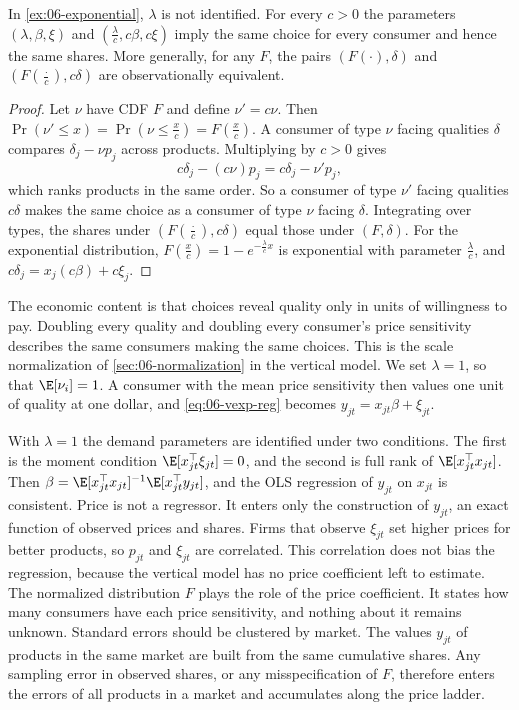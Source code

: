 \begin{proposition}\label{prop:06-vscale}
In \cref{ex:06-exponential}, $\lambda$ is not identified. For every $c > 0$ the parameters
$(\lambda, \beta, \xi)$ and $(\frac{\lambda}{c}, c\beta, c\xi)$ imply the same choice for every consumer and
hence the same shares. More generally, for any $F$, the pairs $(F(\cdot), \delta)$ and
$(F(\frac{\cdot}{c}), c\delta)$ are observationally equivalent.
\end{proposition}

\begin{proof}
Let $\nu$ have CDF $F$ and define $\nu' = c\nu$. Then $\Pr(\nu' \le x) = \Pr(\nu \le \frac{x}{c}) = F(\frac{x}{c})$.
A consumer of type $\nu$ facing qualities $\delta$ compares $\delta_j - \nu p_j$ across products. Multiplying
by $c > 0$ gives
\begin{equation*}
  c\delta_j - (c\nu)p_j = c\delta_j - \nu' p_j ,
\end{equation*}
which ranks products in the same order. So a consumer of type $\nu'$ facing qualities $c\delta$ makes the
same choice as a consumer of type $\nu$ facing $\delta$. Integrating over types, the shares under
$(F(\frac{\cdot}{c}), c\delta)$ equal those under $(F, \delta)$. For the exponential distribution,
$F(\frac{x}{c}) = 1 - e^{-\frac{\lambda}{c}x}$ is exponential with parameter $\frac{\lambda}{c}$, and
$c\delta_j = x_j(c\beta) + c\xi_j$.
\end{proof}

The economic content is that choices reveal quality only in units of willingness to pay. Doubling every
quality and doubling every consumer's price sensitivity describes the same consumers making the same
choices. This is the scale normalization of \cref{sec:06-normalization} in the vertical model. We set
$\lambda = 1$, so that $\E[\nu_i] = 1$. A consumer with the mean price sensitivity then values one unit of
quality at one dollar, and \eqref{eq:06-vexp-reg} becomes $y_{jt} = x_{jt}\beta + \xi_{jt}$.

With $\lambda = 1$ the demand parameters are identified under two conditions. The first is the moment
condition $\E[x_{jt}^\top\xi_{jt}] = 0$, and the second is full rank of $\E[x_{jt}^\top x_{jt}]$. Then
$\beta = \E[x_{jt}^\top x_{jt}]^{-1}\E[x_{jt}^\top y_{jt}]$, and the OLS regression of $y_{jt}$ on $x_{jt}$ is
consistent. Price is not a regressor. It enters only the construction of $y_{jt}$, an exact function of
observed prices and shares. Firms that observe $\xi_{jt}$ set higher prices for better products, so
$p_{jt}$ and $\xi_{jt}$ are correlated. This correlation does not bias the regression, because the vertical
model has no price coefficient left to estimate. The normalized distribution $F$ plays the role of the
price coefficient. It states how many consumers have each price sensitivity, and nothing about it remains
unknown. Standard errors should be clustered by market. The values $y_{jt}$ of products in the same market
are built from the same cumulative shares. Any sampling error in observed shares, or any misspecification of $F$,
therefore enters the errors of all products in a market and accumulates along the price ladder.

